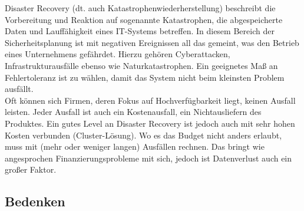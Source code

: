 \documentclass[letterpaper, 12pt]{article}
\let\tempsubsection\subsection
\renewcommand\subsection[1]{\vspace{0cm}\tempsubsection{#1}\vspace{0cm}}
\begin{document}
Disaster Recovery (dt. auch Katastrophenwiederherstellung) beschreibt
die Vorbereitung und Reaktion auf sogenannte Katastrophen, die abgespeicherte Daten
und Lauffähigkeit eines IT-Systems betreffen. In diesem Bereich der Sicherheitsplanung ist mit
negativen Ereignissen all das gemeint, was den Betrieb eines Unternehmens gefährdet. Hierzu gehören
Cyberattacken, Infrastrukturausfälle ebenso wie Naturkatastrophen. Ein geeignetes Maß an Fehlertoleranz ist zu wählen, damit das System nicht beim kleinsten Problem ausfällt. \\
Oft können sich Firmen, deren Fokus auf Hochverfügbarkeit liegt, keinen Ausfall leisten. Jeder Ausfall ist auch ein Kostenausfall, ein Nichtausliefern des Produktes. Ein gutes Level an Disaster Recovery ist jedoch auch mit sehr hohen Kosten verbunden (Cluster-Lösung). Wo es das Budget nicht anders erlaubt, muss mit (mehr oder weniger langen) Ausfällen rechnen. Das bringt wie angesprochen Finanzierungsprobleme mit sich, jedoch ist Datenverlust auch ein großer Faktor. \cite{dezsys}

\subsection{Bedenken}
\end{document}
